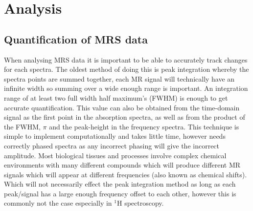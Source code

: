 \documentclass[class=article, crop=false]{standalone}
\begin{document}
\section{Analysis}

\subsection{Quantification of MRS data}

When analysing MRS data it is important to be able to accurately track changes for each spectra. The oldest method of doing this is peak integration whereby the spectra points are summed together, each MR signal will technically have an infinite width so summing over a wide enough range is important. An integration range of at least two full width half maximum's (FWHM) is enough to get accurate quantification\cite{Near2021PreprocessingRecommendations}. This value can also be obtained from the time-domain signal as the first point in the absorption spectra, as well as from the product of the FWHM, $\pi$ and the peak-height in the frequency spectra\cite{deGraaf2019InSpectroscopy}. This technique is simple to implement computationally and takes little time, however needs correctly phased spectra as any incorrect phasing will give the incorrect amplitude. Most biological tissues and processes involve complex chemical environments with many different compounds which will produce different MR signals which will appear at different frequencies (also known as chemical shifts). Which will not necessarily effect the peak integration method as long as each peak/signal has a large enough frequency offset to each other, however this is commonly not the case especially in $^1$H spectroscopy\cite{Alger2010QuantitativeReview}. 
\end{document}
